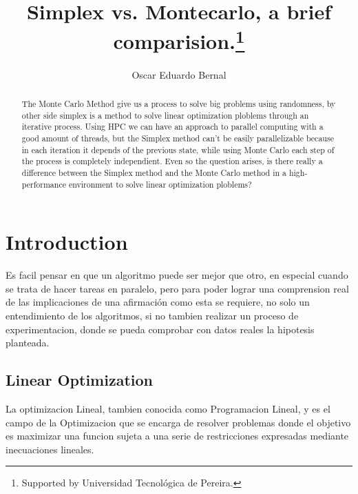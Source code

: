 \documentclass[runningheads]{llncs}
\begin{document}
%
\title{Simplex vs. Montecarlo, a brief comparision.\thanks{Supported by Universidad Tecnológica de Pereira.}}
%
%
\author{Oscar Eduardo Bernal}
%
%
%
\maketitle              %
%
\begin{abstract}
The Monte Carlo Method give us a process to solve big problems using randomness, by other side simplex is a method to solve linear optimization ploblems through an iterative process. Using HPC we can have an approach to parallel computing with a good amount of threads, but the Simplex method can't be easily parallelizable because in each iteration it depends of the previous state, while using Monte Carlo each step of the process is completely independient. Even so the question arises, is there really a difference between the Simplex method and the Monte Carlo method in a high-performance environment to solve linear optimization ploblems?

\end{abstract}
%
%
%
\section{Introduction}
Es facil pensar en que un algoritmo puede ser mejor que otro, en especial cuando se trata de hacer tareas en paralelo, pero para poder lograr una comprension real de las implicaciones de una afirmación como esta se requiere, no solo un entendimiento de los algoritmos, si no tambien realizar un proceso de experimentacion, donde se pueda comprobar con datos reales la hipotesis planteada.

\subsection{Linear Optimization}
La optimizacion Lineal, tambien conocida como Programacion Lineal, y es el campo de la Optimizacion que se encarga de resolver problemas donde el objetivo es maximizar una funcion sujeta a una serie de restricciones expresadas mediante inecuaciones lineales. 
\end{document}

